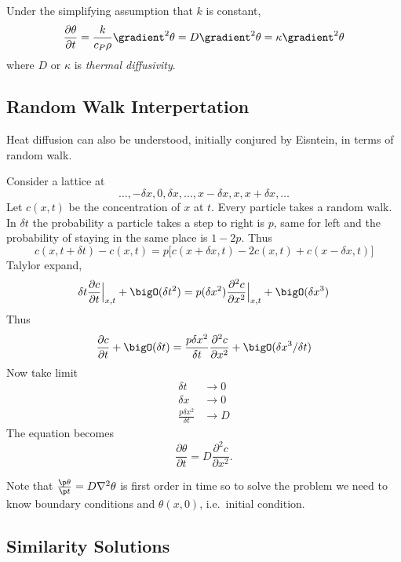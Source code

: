 \documentclass[a4paper]{article}
\newcommand*{\grad}{\gradient}
\begin{document}
Under the simplifying assumption that \(k\) is constant,
\[
  \frac{\partial \theta}{\partial t} = \frac{k}{c_P\rho} \grad^2 \theta = D \grad^2 \theta = \kappa \grad^2 \theta
\]
where \(D\) or \(\kappa\) is \emph{thermal diffusivity}.

\subsection{Random Walk Interpertation}

Heat diffusion can also be understood, initially conjured by Eisntein, in terms of random walk.

Consider a lattice at
\[
  \dots, -\delta x, 0, \delta x, \dots, x- \delta x, x, x+ \delta x, \dots
\]
Let \(c(x,t)\) be the concentration of \(x\) at \(t\). Every particle takes a random walk. In \(\delta t\) the probability a particle takes a step to right is \(p\), same for left and the probability of staying in the same place is \(1-2p\). Thus
\[
  c(x, t + \delta t) - c(x, t) = p \Big[ c(x + \delta x, t) -2 c(x, t) + c(x - \delta x, t) \Big]
\]
Talylor expand,
\[
  \delta t \frac{\partial c}{\partial t} \Big|_{x,t} + \bigO(\delta t^2) = p(\delta x^2) \frac{\partial^2 c}{\partial x^2} \Big|_{x,t} + \bigO(\delta x^3)
\]
Thus
\[
  \frac{\partial c}{\partial t} + \bigO(\delta t) = \frac{p \delta x^2}{\delta t} \frac{\partial^2 c}{\partial x^2} + \bigO(\delta x^3/\delta t)
\]
Now take limit
\begin{align*}
  \delta t &\to 0 \\
  \delta x &\to 0 \\
  \frac{p\delta x^2}{\delta t} &\to D
\end{align*}
The equation becomes
\[
  \frac{\partial \theta}{\partial t} = D \frac{\partial^2 c}{\partial x^2}.
\]

Note that \(\frac{\p \theta}{\p t} = D \nabla^2\theta\) is first order in time so to solve the problem we need to know boundary conditions and \(\theta(x,0)\), i.e.\ initial condition.

\subsection{Similarity Solutions}
\end{document}

